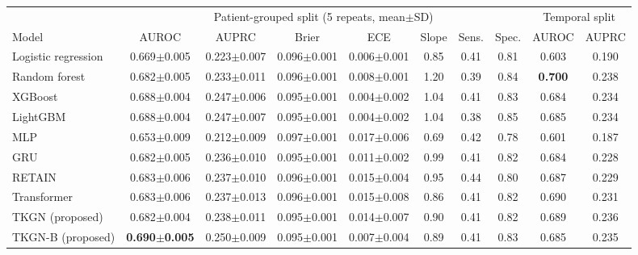 \begin{tabular}{@{}lccccccc|cc@{}}
\toprule
 & \multicolumn{7}{c|}{Patient-grouped split (5 repeats, mean$\pm$SD)} & \multicolumn{2}{c}{Temporal split} \\
Model & AUROC & AUPRC & Brier & ECE & Slope & Sens. & Spec. & AUROC & AUPRC \\
\midrule
Logistic regression & 0.669$\pm$0.005 & 0.223$\pm$0.007 & 0.096$\pm$0.001 & 0.006$\pm$0.001 & 0.85 & 0.41 & 0.81 & 0.603 & 0.190 \\
Random forest & 0.682$\pm$0.005 & 0.233$\pm$0.011 & 0.096$\pm$0.001 & 0.008$\pm$0.001 & 1.20 & 0.39 & 0.84 & \textbf{0.700} & 0.238 \\
XGBoost & 0.688$\pm$0.004 & 0.247$\pm$0.006 & 0.095$\pm$0.001 & 0.004$\pm$0.002 & 1.04 & 0.41 & 0.83 & 0.684 & 0.234 \\
LightGBM & 0.688$\pm$0.004 & 0.247$\pm$0.007 & 0.095$\pm$0.001 & 0.004$\pm$0.002 & 1.04 & 0.38 & 0.85 & 0.685 & 0.234 \\
MLP & 0.653$\pm$0.009 & 0.212$\pm$0.009 & 0.097$\pm$0.001 & 0.017$\pm$0.006 & 0.69 & 0.42 & 0.78 & 0.601 & 0.187 \\
\midrule
GRU & 0.682$\pm$0.005 & 0.236$\pm$0.010 & 0.095$\pm$0.001 & 0.011$\pm$0.002 & 0.99 & 0.41 & 0.82 & 0.684 & 0.228 \\
RETAIN & 0.683$\pm$0.006 & 0.237$\pm$0.010 & 0.096$\pm$0.001 & 0.015$\pm$0.004 & 0.95 & 0.44 & 0.80 & 0.687 & 0.229 \\
Transformer & 0.683$\pm$0.006 & 0.237$\pm$0.013 & 0.096$\pm$0.001 & 0.015$\pm$0.008 & 0.86 & 0.41 & 0.82 & 0.690 & 0.231 \\
\midrule
TKGN (proposed) & 0.682$\pm$0.004 & 0.238$\pm$0.011 & 0.095$\pm$0.001 & 0.014$\pm$0.007 & 0.90 & 0.41 & 0.82 & 0.689 & 0.236 \\
TKGN-B (proposed) & \textbf{0.690$\pm$0.005} & 0.250$\pm$0.009 & 0.095$\pm$0.001 & 0.007$\pm$0.004 & 0.89 & 0.41 & 0.83 & 0.685 & 0.235 \\
\bottomrule
\end{tabular}
